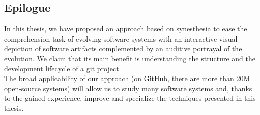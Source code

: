 \subsection{Epilogue}
In this thesis, we have proposed an approach based on synesthesia to ease the comprehension task of evolving software systems with an interactive visual depiction of software artifacts complemented by an auditive portrayal of the evolution. We claim that its main benefit is understanding the structure and the development lifecycle of a git project. \\
The broad applicability of our approach  (on GitHub, there are more than 20M open-source systems) will allow us to study many software systems and, thanks to the gained experience, improve and specialize the techniques presented in this thesis.  